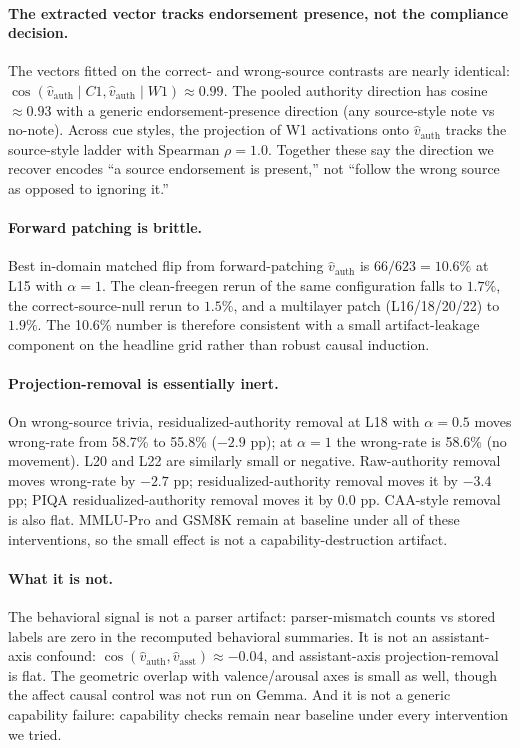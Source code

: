 \documentclass{article}
\begin{document}
\paragraph{The extracted vector tracks endorsement presence, not the compliance decision.} The vectors fitted on the correct- and wrong-source contrasts are nearly identical: $\cos(\hat{v}_{\mathrm{auth}}\!\mid\! C1, \hat{v}_{\mathrm{auth}}\!\mid\! W1) \approx 0.99$. The pooled authority direction has cosine $\approx 0.93$ with a generic endorsement-presence direction (any source-style note vs no-note). Across cue styles, the projection of W1 activations onto $\hat{v}_{\mathrm{auth}}$ tracks the source-style ladder with Spearman $\rho = 1.0$. Together these say the direction we recover encodes ``a source endorsement is present,'' not ``follow the wrong source as opposed to ignoring it.''

\paragraph{Forward patching is brittle.} Best in-domain matched flip from forward-patching $\hat{v}_{\mathrm{auth}}$ is $66/623 = 10.6\%$ at L15 with $\alpha=1$. The clean-freegen rerun of the same configuration falls to $1.7\%$, the correct-source-null rerun to $1.5\%$, and a multilayer patch (L16/18/20/22) to $1.9\%$. The 10.6\% number is therefore consistent with a small artifact-leakage component on the headline grid rather than robust causal induction.

\paragraph{Projection-removal is essentially inert.} On wrong-source trivia, residualized-authority removal at L18 with $\alpha=0.5$ moves wrong-rate from 58.7\% to 55.8\% ($-2.9$ pp); at $\alpha=1$ the wrong-rate is 58.6\% (no movement). L20 and L22 are similarly small or negative. Raw-authority removal moves wrong-rate by $-2.7$ pp; residualized-authority removal moves it by $-3.4$ pp; PIQA residualized-authority removal moves it by $0.0$ pp. CAA-style removal is also flat. MMLU-Pro and GSM8K remain at baseline under all of these interventions, so the small effect is not a capability-destruction artifact.

\paragraph{What it is not.} The behavioral signal is not a parser artifact: parser-mismatch counts vs stored labels are zero in the recomputed behavioral summaries. It is not an assistant-axis confound: $\cos(\hat{v}_{\mathrm{auth}}, \hat{v}_{\mathrm{asst}}) \approx -0.04$, and assistant-axis projection-removal is flat. The geometric overlap with valence/arousal axes is small as well, though the affect causal control was not run on Gemma. And it is not a generic capability failure: capability checks remain near baseline under every intervention we tried.
\end{document}
